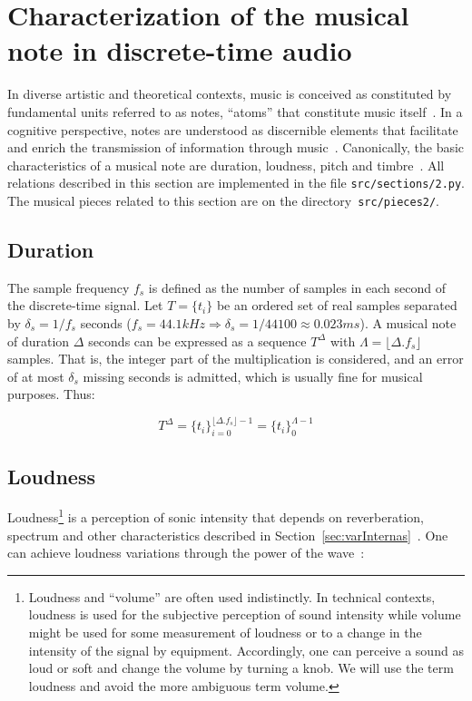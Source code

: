 \section{Characterization of the musical note in discrete-time audio} \label{sec:discNote}\label{sec:notaDisc}
In diverse artistic and theoretical contexts, music is conceived as constituted by fundamental units referred to as notes, ``atoms'' that constitute music itself~\cite{Wisnick, Lovelock, Webern}.
In a cognitive perspective, notes are understood as discernible elements that facilitate and enrich the transmission of information through music~\cite{Roederer, Lacerda}.
Canonically, the basic characteristics of a musical note are duration, loudness, pitch and timbre~\cite{Lacerda}.
All relations described in this section are implemented in the file \texttt{src/sections/2.py}.
The musical pieces related to this section are on the directory~\texttt{src/pieces2/}.~\cite{MASSA}

\subsection{Duration}
The sample frequency $f_s$ is defined as the number of samples in each second of the discrete-time signal. Let $T=\{t_i\}$ be an ordered set of real samples separated by $\delta_s=1/f_s$ seconds ($f_s=44.1kHz \Rightarrow \delta_s=1/44100\approx 0.023ms$).
A musical note of duration $\Delta$ seconds can be expressed as a sequence $T^{\Delta}$ with $\Lambda = \lfloor \Delta . f_s \rfloor$ samples.
That is, the integer part of the multiplication is considered, and an error of at most $\delta_s$ missing seconds is admitted, which is usually fine for musical purposes. Thus:


\begin{equation}\label{eq:dur}
T^{\Delta}={\{t_i\}}_{i=0}^{\lfloor \Delta . f_s \rfloor -1} = \{t_i\}_0^{\Lambda-1}
\end{equation}

\subsection{Loudness}\label{subsec:volume}
Loudness\footnote{Loudness and ``volume'' are often used indistinctly.
In technical contexts, loudness is used for the subjective perception of sound intensity
while volume might be used for some measurement of loudness or to a change
in the intensity of the signal by equipment.
Accordingly, one can perceive a sound as loud or soft and change the volume
by turning a knob.
We will use the term loudness and avoid the more ambiguous term volume.} 
is a perception of sonic intensity that depends on reverberation,
spectrum and other characteristics described in Section~\ref{sec:varInternas}~\cite{Chowning}.
One can achieve loudness variations through the power of the wave~\cite{Chowning}:

